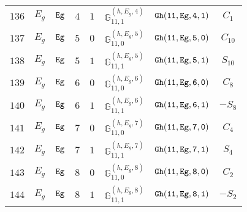 \documentclass[fleqn,8pt]{jsarticle}
\begin{document}
\begin{table}[ht!]
\begin{center}
\begin{tabular}{cccccccc}
$ 136 $ & $ E_{g} $ & $ {\tt Eg} $ & $ 4 $ & $ 1 $ & $ \mathbb{G}_{11,1}^{(h,E_{g},4)} $ & $ {\tt Gh(11,Eg,4,1)} $ & $ C_{1} $ \\
$ 137 $ & $ E_{g} $ & $ {\tt Eg} $ & $ 5 $ & $ 0 $ & $ \mathbb{G}_{11,0}^{(h,E_{g},5)} $ & $ {\tt Gh(11,Eg,5,0)} $ & $ C_{10} $ \\
$ 138 $ & $ E_{g} $ & $ {\tt Eg} $ & $ 5 $ & $ 1 $ & $ \mathbb{G}_{11,1}^{(h,E_{g},5)} $ & $ {\tt Gh(11,Eg,5,1)} $ & $ S_{10} $ \\
$ 139 $ & $ E_{g} $ & $ {\tt Eg} $ & $ 6 $ & $ 0 $ & $ \mathbb{G}_{11,0}^{(h,E_{g},6)} $ & $ {\tt Gh(11,Eg,6,0)} $ & $ C_{8} $ \\
$ 140 $ & $ E_{g} $ & $ {\tt Eg} $ & $ 6 $ & $ 1 $ & $ \mathbb{G}_{11,1}^{(h,E_{g},6)} $ & $ {\tt Gh(11,Eg,6,1)} $ & $ - S_{8} $ \\
$ 141 $ & $ E_{g} $ & $ {\tt Eg} $ & $ 7 $ & $ 0 $ & $ \mathbb{G}_{11,0}^{(h,E_{g},7)} $ & $ {\tt Gh(11,Eg,7,0)} $ & $ C_{4} $ \\
$ 142 $ & $ E_{g} $ & $ {\tt Eg} $ & $ 7 $ & $ 1 $ & $ \mathbb{G}_{11,1}^{(h,E_{g},7)} $ & $ {\tt Gh(11,Eg,7,1)} $ & $ S_{4} $ \\
$ 143 $ & $ E_{g} $ & $ {\tt Eg} $ & $ 8 $ & $ 0 $ & $ \mathbb{G}_{11,0}^{(h,E_{g},8)} $ & $ {\tt Gh(11,Eg,8,0)} $ & $ C_{2} $ \\
$ 144 $ & $ E_{g} $ & $ {\tt Eg} $ & $ 8 $ & $ 1 $ & $ \mathbb{G}_{11,1}^{(h,E_{g},8)} $ & $ {\tt Gh(11,Eg,8,1)} $ & $ - S_{2} $ \\
 \hline \hline
\end{tabular}
\end{center}
\end{table}
\end{document}
